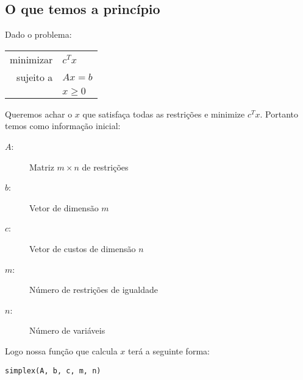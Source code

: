 \documentclass[12pt]{article}
\begin{document}
\subsection{O que temos a princípio}
\label{fase2:args}
	Dado o problema:
    \begin{center}
    	\begin{tabular}{r l}
	  		minimizar & $c^Tx$ \\
        
        	sujeito a & $Ax = b$ \\
            & $x \geq 0$ \\
        \end{tabular}
    \end{center}
  
	Queremos achar o $x$ que satisfaça todas as restrições e minimize $c^Tx$. Portanto temos como informação inicial: 
	\begin{description}
		\item[$A$:] Matriz $m \times n$ de restrições
		\item[$b$:] Vetor de dimensão $m$
        \item[$c$:] Vetor de custos de dimensão $n$
        \item[$m$:] Número de restrições de igualdade
        \item[$n$:] Número de variáveis
	\end{description}

    Logo nossa função que calcula $x$ terá a seguinte forma: \\
    \begin{center}
    \texttt{simplex(A, b, c, m, n)}
    \end{center}
\end{document}
